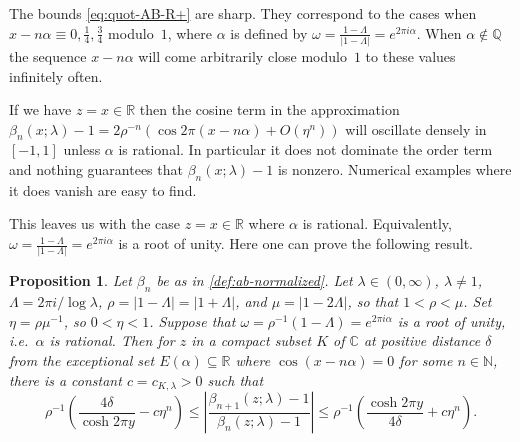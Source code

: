 \documentclass[11pt,a4paper]{amsart}
\newcommand{\N}{\mathbb{N}}
\newcommand{\Q}{\mathbb{Q}}
\newcommand{\R}{\mathbb{R}}
\newcommand{\C}{\mathbb{C}}
\theoremstyle{plain}
\newtheorem{prop}[theorem]{Proposition}
\theoremstyle{remark}
\begin{document}
The bounds \eqref{eq:quot-AB-R+} are sharp. They correspond to the cases when
$x-n\alpha \equiv 0,\frac{1}{4},\frac{3}{4}$ modulo~$1$, where $\alpha$ is defined
by $\omega = \frac{1-\Lambda}{|1-\Lambda|} = e^{2\pi i \alpha}$. When $\alpha \notin \Q$
the sequence $x - n\alpha$ will come arbitrarily close modulo~$1$ to these 
values infinitely often.


If we have $z = x \in \R$ then the cosine term in the approximation
$\beta_{n}(x;\lambda) - 1 = 2\rho^{-n}( \cos 2\pi(x - n\alpha) + O(\eta^{n}))$ will oscillate densely in $[-1,1]$ unless $\alpha$ is rational. In particular it does not dominate the order term and nothing guarantees that 
$\beta_{n}(x;\lambda) - 1$ is nonzero. Numerical examples where it does vanish are easy to find.


This leaves us with the case $z = x \in \R$ where $\alpha$ is rational. Equivalently, $\omega = \frac{1-\Lambda}{|1-\Lambda|} = e^{2\pi i \alpha}$ is a root of unity. Here one can prove the following result.


\begin{prop}
\label{prop:quot-AB-R+Q}
Let $\beta_{n}$ be as in \eqref{def:ab-normalized}.
Let $\lambda \in (0,\infty)$, $\lambda \neq 1$, $\Lambda = 2\pi i/\log\lambda$,
$\rho = |1 - \Lambda| = |1 + \Lambda|$, and $\mu = |1 - 2\Lambda|$, so that $1 < \rho < \mu$. 
Set $\eta = \rho \mu^{-1}$, so $0 < \eta < 1$. Suppose that $\omega = \rho^{-1} (1-\Lambda) = e^{2\pi i \alpha}$ is a root of unity, i.e.\ $\alpha$ is rational. Then for $z$ in a compact subset $K$ of $\C$ at positive distance $\delta$ from the exceptional set $E(\alpha) \subseteq \R$ where  $\cos(x - n\alpha) = 0$ for some $n \in \N$, there is a constant $c = c_{K,\lambda}> 0$ such that
%
\begin{equation}
\label{eq:prop:quot-AB-R+Q}
         \rho^{-1}
         \left( \frac{4\delta}{\cosh 2 \pi y} - c \eta^{n} \right)
	\leq \left| \frac{\beta_{n+1}(z;\lambda)-1}{\beta_{n}(z;\lambda)-1}\right|
	\leq \rho^{-1}
	     \left( \frac{\cosh 2\pi y}{4\delta} + c \eta^{n} \right).
\end{equation}
%
\end{prop}
\end{document}

